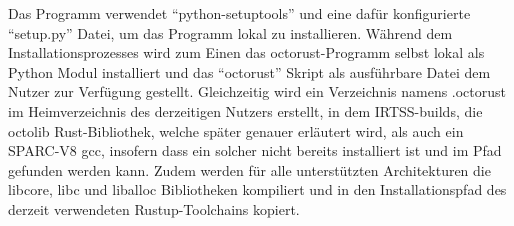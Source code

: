 Das Programm verwendet "`python-setuptools"' und eine dafür konfigurierte "`setup.py"' Datei, um das Programm lokal zu installieren.
Während dem Installationsprozesses wird zum Einen das octorust-Programm selbst lokal als Python Modul installiert und das
"`octorust"' Skript als ausführbare Datei dem Nutzer zur Verfügung gestellt.
Gleichzeitig wird ein Verzeichnis namens .octorust
im Heimverzeichnis des derzeitigen Nutzers erstellt, in dem IRTSS-builds, die octolib Rust-Bibliothek, welche später 
genauer erläutert wird, als auch ein SPARC-V8 gcc, insofern dass ein
solcher nicht bereits installiert ist und im Pfad gefunden werden kann.
Zudem werden für alle unterstützten Architekturen die libcore, libc und liballoc Bibliotheken kompiliert und in den
Installationspfad des derzeit verwendeten Rustup-Toolchains kopiert.

